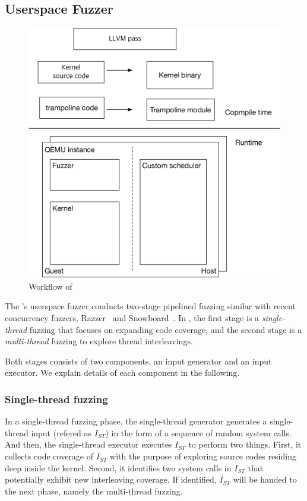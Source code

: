 \subsection{Userspace Fuzzer}
\label{ss:fuzzer}



\begin{figure}
  \includegraphics[width=0.9\linewidth]{fig/architecture.pdf}
  \caption{Workflow of \sys {}}
  \label{fig:workflow}
\end{figure}


The \sys's userspace fuzzer conducts two-stage pipelined fuzzing
similar with recent concurrency fuzzers, Razzer~\cite{razzer} and
Snowboard~\cite{snowboard}.
%
In \sys, the first stage is a \textit{single-thread} fuzzing that
focuses on expanding code coverage, and the second stage is a
\textit{multi-thread} fuzzing to explore thread interleavings.

Both stages consists of two components, an input generator and an
input executor. We explain details of each component in the following.


\subsubsection{Single-thread fuzzing}
%
In a single-thread fuzzing phase, the single-thread generator
generates a single-thread input (refered as $I_{ST}$) in the form of a
sequence of random system calls.
%
And then, the single-thread executor executes $I_{ST}$ to perform two
things.
%
First, it collects code coverage of $I_{ST}$ with the purpose of
exploring source codes residing deep inside the kernel.
%
Second, it identifies two system calls in $I_{ST}$ that potentially
exhibit new interleaving coverage.  If identified, $I_{ST}$ will be
handed to the next phase, namely the multi-thread fuzzing.


